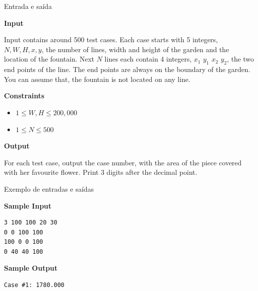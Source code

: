 \begin{frame}[fragile]{Entrada e saída}

\textbf{Input}

Input contains around 500 test cases. Each case starts with 5 integers, $N, W, H, x, y$, the number 
of lines, width and height of the garden and the location of the fountain. Next $N$ lines each 
contain 4 integers, $x_1$ $y_1$ $x_2$ $y_2$, the two end points of the line. The end points are always 
on the boundary of the garden. You can assume that, the fountain is not located on any line.

\textbf{Constraints}

\begin{itemize}
    \item $1\leq W, H\leq 200,000$
    \item $1\leq N\leq 500$
\end{itemize}

\textbf{Output}

For each test case, output the case number, with the area of the piece covered with her favourite flower.
Print 3 digits after the decimal point.

\end{frame}

\begin{frame}[fragile]{Exemplo de entradas e saídas}

\begin{minipage}[t]{0.5\textwidth}
\textbf{Sample Input}
\begin{verbatim}
3 100 100 20 30
0 0 100 100
100 0 0 100
0 40 40 100
\end{verbatim}
\end{minipage}
\begin{minipage}[t]{0.45\textwidth}
\textbf{Sample Output}
\begin{verbatim}
Case #1: 1780.000
\end{verbatim}
\end{minipage}
\end{frame}

